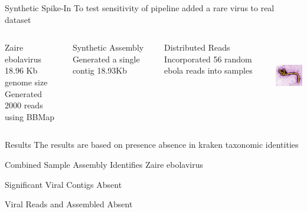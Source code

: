 \documentclass[11pt]{beamer}
\begin{document}
	
	\begin{frame}{Synthetic Spike-In}
	To test sensitivity of pipeline added a rare virus to real dataset
	\begin{columns}
	\begin{block}{Zaire ebolavirus}
	18.96 Kb genome size \\ Generated 2000 reads using BBMap
	\end{block}
	
	\begin{block}{Synthetic Assembly}
	Generated a single contig 18.93Kb
	\end{block}
	
	\begin{block}{Distributed Reads}
	Incorporated 56 random ebola reads into samples
	\end{block}
	
	\includegraphics[height=3cm, width=3cm]{Ebola.jpg}
	\end{columns}
	\end{frame}
	
	\begin{frame}{Results}
	The results are based on presence absence in kraken taxonomic identities
	\begin{block}{Combined Sample Assembly}
	Identifies Zaire ebolavirus
	\end{block}
	
	\begin{block}{Significant Viral Contigs}
	Absent
	\end{block}
	
	\begin{block}{Viral Reads and Assembled}
	Absent
	\end{block}
	
	
	\end{frame}
	
\end{document}
